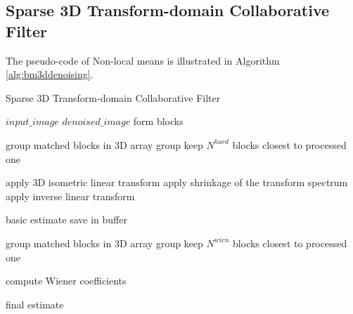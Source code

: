 \subsection{Sparse 3D Transform-domain Collaborative Filter}

The pseudo-code of Non-local means is illustrated in Algorithm \ref{alg:bm3ddenoising}.

\begin{algorithm}
	\caption{Sparse 3D Transform-domain Collaborative Filter}\label{alg:bm3ddenoising}
	\begin{algorithmic}[1]
		\Require $input\_image$
		\Ensure $denoised\_image$
		\State form blocks
		
			\State group matched blocks in 3D array group
			\State keep $N^{hard}$ blocks closest to processed one
		\EndFor
		
		\State apply 3D isometric linear transform
		\State apply shrinkage of the transform spectrum
		\State apply inverse linear transform
		
			\State basic estimate
			\State save in buffer
		\EndFor	
		
			\State group matched blocks in 3D array group
			\State keep $N^{wien}$ blocks closest to processed one
		\EndFor
		
		\State compute Wiener coefficients
		
			\State final estimate
		\EndFor		
							
		\EndProcedure
	\end{algorithmic}
\end{algorithm}